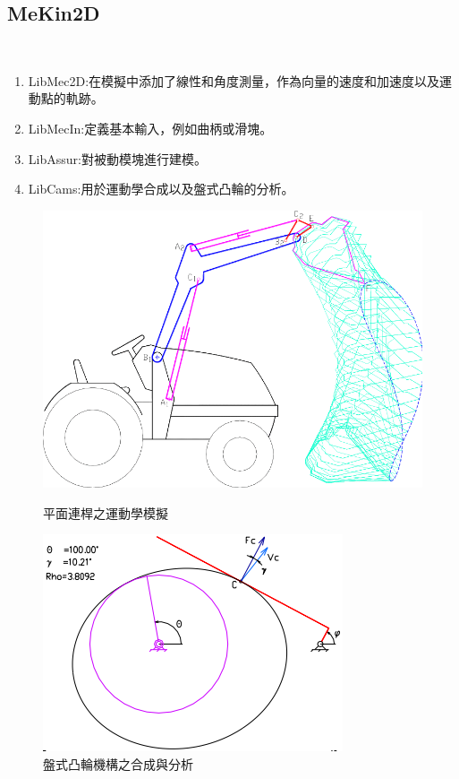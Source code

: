 \documentclass[14pt,a4paper]{report}  %
\newcommand{\fourteen}{\fontsize{14pt}{\baselineskip}\selectfont}%
\begin{document}
{      	\subsection{MeKin2D}
       	\hspace*{\fill} \\
       	\fourteen {MeKin2D000是用Free Pascal編寫的子程序包，主要使用模塊化方法對平面連桿進行運動學模擬，用於磁盤凸輪機構的合成和分析，以及漸開線齒輪的產生。其中，MeKin2D的套件包含4個子程式。 分別有:}
       \begin{enumerate} 
       \item LibMec2D:在模擬中添加了線性和角度測量，作為向量的速度和加速度以及運動點的軌跡。
       \item LibMecIn:定義基本輸入，例如曲柄或滑塊。
       \item LibAssur:對被動模塊進行建模。
       \item LibCams:用於運動學合成以及盤式凸輪的分析。
       \end{enumerate}
       	\begin{figure}[H]
        	\centering
        	\includegraphics[scale=0.4]{平面連桿之運動學模擬.png} 
        	\caption{平面連桿之運動學模擬} 
        	\label{fig:scale}
        	\includegraphics[scale=0.8]{盤式凸輪機構之合成與分析.png} 
        	\caption{盤式凸輪機構之合成與分析} 
        	\label{fig:scale}   
    	\end{figure}
    	 \hspace*{\fill} \\
}
\end{document}
